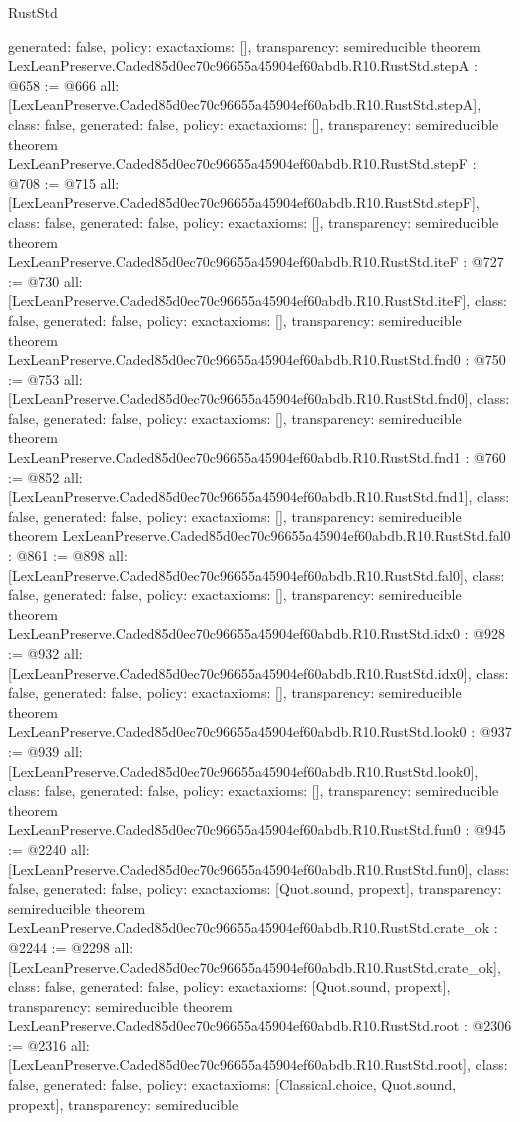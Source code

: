 \begin{lexlean}{RustStd}
\begin{coremodule}
{  generated: false,
  policy: exact{axioms: []},
  transparency: semireducible
}
theorem LexLeanPreserve.Caded85d0ec70c96655a45904ef60abdb.R10.RustStd.stepA : @658 := @666 {
  all: [LexLeanPreserve.Caded85d0ec70c96655a45904ef60abdb.R10.RustStd.stepA],
  class: false,
  generated: false,
  policy: exact{axioms: []},
  transparency: semireducible
}
theorem LexLeanPreserve.Caded85d0ec70c96655a45904ef60abdb.R10.RustStd.stepF : @708 := @715 {
  all: [LexLeanPreserve.Caded85d0ec70c96655a45904ef60abdb.R10.RustStd.stepF],
  class: false,
  generated: false,
  policy: exact{axioms: []},
  transparency: semireducible
}
theorem LexLeanPreserve.Caded85d0ec70c96655a45904ef60abdb.R10.RustStd.iteF : @727 := @730 {
  all: [LexLeanPreserve.Caded85d0ec70c96655a45904ef60abdb.R10.RustStd.iteF],
  class: false,
  generated: false,
  policy: exact{axioms: []},
  transparency: semireducible
}
theorem LexLeanPreserve.Caded85d0ec70c96655a45904ef60abdb.R10.RustStd.fnd0 : @750 := @753 {
  all: [LexLeanPreserve.Caded85d0ec70c96655a45904ef60abdb.R10.RustStd.fnd0],
  class: false,
  generated: false,
  policy: exact{axioms: []},
  transparency: semireducible
}
theorem LexLeanPreserve.Caded85d0ec70c96655a45904ef60abdb.R10.RustStd.fnd1 : @760 := @852 {
  all: [LexLeanPreserve.Caded85d0ec70c96655a45904ef60abdb.R10.RustStd.fnd1],
  class: false,
  generated: false,
  policy: exact{axioms: []},
  transparency: semireducible
}
theorem LexLeanPreserve.Caded85d0ec70c96655a45904ef60abdb.R10.RustStd.fal0 : @861 := @898 {
  all: [LexLeanPreserve.Caded85d0ec70c96655a45904ef60abdb.R10.RustStd.fal0],
  class: false,
  generated: false,
  policy: exact{axioms: []},
  transparency: semireducible
}
theorem LexLeanPreserve.Caded85d0ec70c96655a45904ef60abdb.R10.RustStd.idx0 : @928 := @932 {
  all: [LexLeanPreserve.Caded85d0ec70c96655a45904ef60abdb.R10.RustStd.idx0],
  class: false,
  generated: false,
  policy: exact{axioms: []},
  transparency: semireducible
}
theorem LexLeanPreserve.Caded85d0ec70c96655a45904ef60abdb.R10.RustStd.look0 : @937 := @939 {
  all: [LexLeanPreserve.Caded85d0ec70c96655a45904ef60abdb.R10.RustStd.look0],
  class: false,
  generated: false,
  policy: exact{axioms: []},
  transparency: semireducible
}
theorem LexLeanPreserve.Caded85d0ec70c96655a45904ef60abdb.R10.RustStd.fun0 : @945 := @2240 {
  all: [LexLeanPreserve.Caded85d0ec70c96655a45904ef60abdb.R10.RustStd.fun0],
  class: false,
  generated: false,
  policy: exact{axioms: [Quot.sound, propext]},
  transparency: semireducible
}
theorem LexLeanPreserve.Caded85d0ec70c96655a45904ef60abdb.R10.RustStd.crate_ok : @2244 := @2298 {
  all: [LexLeanPreserve.Caded85d0ec70c96655a45904ef60abdb.R10.RustStd.crate_ok],
  class: false,
  generated: false,
  policy: exact{axioms: [Quot.sound, propext]},
  transparency: semireducible
}
theorem LexLeanPreserve.Caded85d0ec70c96655a45904ef60abdb.R10.RustStd.root : @2306 := @2316 {
  all: [LexLeanPreserve.Caded85d0ec70c96655a45904ef60abdb.R10.RustStd.root],
  class: false,
  generated: false,
  policy: exact{axioms: [Classical.choice, Quot.sound, propext]},
  transparency: semireducible
}


\end{coremodule}
\end{lexlean}
